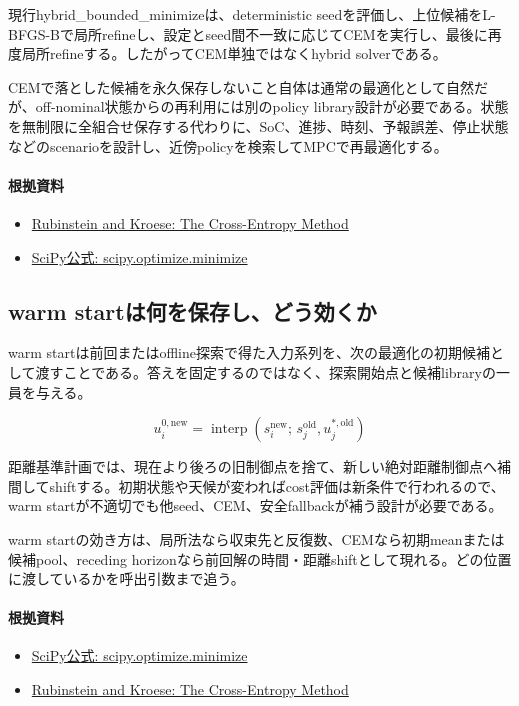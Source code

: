 \documentclass[a4paper,11pt]{article}
\begin{document}
現行hybrid\_bounded\_minimizeは、deterministic seedを評価し、上位候補をL-BFGS-Bで局所refineし、設定とseed間不一致に応じてCEMを実行し、最後に再度局所refineする。したがってCEM単独ではなくhybrid solverである。


CEMで落とした候補を永久保存しないこと自体は通常の最適化として自然だが、off-nominal状態からの再利用には別のpolicy library設計が必要である。状態を無制限に全組合せ保存する代わりに、SoC、進捗、時刻、予報誤差、停止状態などのscenarioを設計し、近傍policyを検索してMPCで再最適化する。

\paragraph{根拠資料}
\begin{itemize}[leftmargin=1.6em]
\item \href{https://link.springer.com/book/10.1007/978-1-4757-4321-0}{Rubinstein and Kroese: The Cross-Entropy Method}
\item \href{https://docs.scipy.org/doc/scipy/reference/generated/scipy.optimize.minimize.html}{SciPy公式: scipy.optimize.minimize}
\end{itemize}

\subsection{warm startは何を保存し、どう効くか}
warm startは前回またはoffline探索で得た入力系列を、次の最適化の初期候補として渡すことである。答えを固定するのではなく、探索開始点と候補libraryの一員を与える。


\[
u^{0,\mathrm{new}}_i=\operatorname{interp}\left(s_i^{\mathrm{new}};\,s_j^{\mathrm{old}},u_j^{\ast,\mathrm{old}}\right)
\]

距離基準計画では、現在より後ろの旧制御点を捨て、新しい絶対距離制御点へ補間してshiftする。初期状態や天候が変わればcost評価は新条件で行われるので、warm startが不適切でも他seed、CEM、安全fallbackが補う設計が必要である。


warm startの効き方は、局所法なら収束先と反復数、CEMなら初期meanまたは候補pool、receding horizonなら前回解の時間・距離shiftとして現れる。どの位置に渡しているかを呼出引数まで追う。

\paragraph{根拠資料}
\begin{itemize}[leftmargin=1.6em]
\item \href{https://docs.scipy.org/doc/scipy/reference/generated/scipy.optimize.minimize.html}{SciPy公式: scipy.optimize.minimize}
\item \href{https://link.springer.com/book/10.1007/978-1-4757-4321-0}{Rubinstein and Kroese: The Cross-Entropy Method}
\end{itemize}
\end{document}
